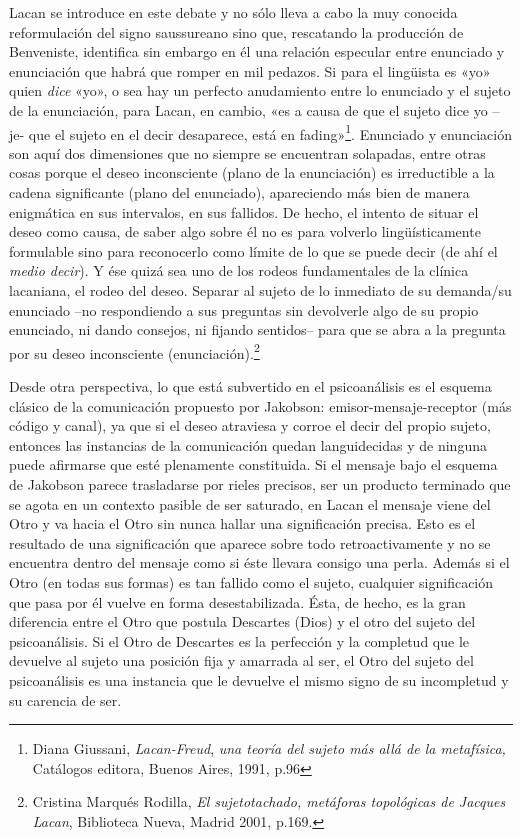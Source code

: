 Lacan se introduce en este debate y no sólo lleva a cabo la muy conocida reformulación del signo saussureano sino que, rescatando la producción de Benveniste, identifica sin embargo en él una relación especular entre enunciado y enunciación que habrá que romper en mil pedazos. Si para el lingüista es «yo» quien \emph{dice} «yo», o sea hay un perfecto anudamiento entre lo enunciado y el sujeto de la enunciación, para Lacan, en cambio, «es a causa de que el sujeto dice yo --je- que el sujeto en el decir desaparece, está en fading»\footnote{Diana Giussani, \emph{Lacan-Freud}, \emph{una teoría del sujeto más allá de la metafísica,} Catálogos editora, Buenos Aires, 1991, p.96}. Enunciado y enunciación son aquí dos dimensiones que no siempre se encuentran solapadas, entre otras cosas porque el deseo inconsciente (plano de la enunciación) es irreductible a la cadena significante (plano del enunciado), apareciendo más bien de manera enigmática en sus intervalos, en sus fallidos. De hecho, el intento de situar el deseo como causa, de saber algo sobre él no es para volverlo lingüísticamente formulable sino para reconocerlo como límite de lo que se puede decir (de ahí el \emph{medio decir}). Y ése quizá sea uno de los rodeos fundamentales de la clínica lacaniana, el rodeo del deseo. Separar al sujeto de lo inmediato de su demanda/su enunciado --no respondiendo a sus preguntas sin devolverle algo de su propio enunciado, ni dando consejos, ni fijando sentidos-- para que se abra a la pregunta por su deseo inconsciente (enunciación).\footnote{Cristina Marqués Rodilla, \emph{El sujetotachado, metáforas topológicas de Jacques Lacan}, Biblioteca Nueva, Madrid 2001, p.169.}

Desde otra perspectiva, lo que está subvertido en el psicoanálisis es el esquema clásico de la comunicación propuesto por Jakobson: emisor-mensaje-receptor (más código y canal), ya que si el deseo atraviesa y corroe el decir del propio sujeto, entonces las instancias de la comunicación quedan languidecidas y de ninguna puede afirmarse que esté plenamente constituida. Si el mensaje bajo el esquema de Jakobson parece trasladarse por rieles precisos, ser un producto terminado que se agota en un contexto pasible de ser saturado, en Lacan el mensaje viene del Otro y va hacia el Otro sin nunca hallar una significación precisa. Esto es el resultado de una significación que aparece sobre todo retroactivamente y no se encuentra dentro del mensaje como si éste llevara consigo una perla. Además si el Otro (en todas sus formas) es tan fallido como el sujeto, cualquier significación que pasa por él vuelve en forma desestabilizada. Ésta, de hecho, es la gran diferencia entre el Otro que postula Descartes (Dios) y el otro del sujeto del psicoanálisis. Si el Otro de Descartes es la perfección y la completud que le devuelve al sujeto una posición fija y amarrada al ser, el Otro del sujeto del psicoanálisis es una instancia que le devuelve el mismo signo de su incompletud y su carencia de ser.

